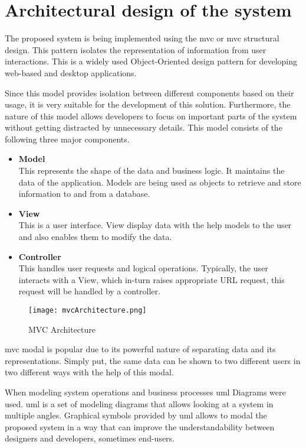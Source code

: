 \documentclass[12pt]{report}
\begin{document}
\section{Architectural design of the system}
The proposed system is being implemented using the \acrshort{mvc} or \acrlong{mvc} structural design. This pattern isolates the representation of information from user interactions. This is a widely used Object-Oriented design pattern for developing web-based and desktop applications.

Since this model provides isolation between different components based on their usage, it is very suitable for the development of this solution. Furthermore, the nature of this model allows developers to focus on important parts of the system without getting distracted by unnecessary details. This model consists of the following three major components.
\begin{itemize}
	\item {\bf{Model}}\\
	      This represents the shape of the data and business logic. It maintains the data of the application. Models are being used as objects to retrieve and store information to and from a database.

	\item {\bf{View}}\\
	      This is a user interface. View display data with the help models to the user and also enables them to modify the data.

	\item {\bf{Controller}}\\
	      This handles user requests and logical operations. Typically, the user interacts with a View, which in-turn raises appropriate URL request, this request will be handled by a controller.
\end{itemize}

\begin{figure}[H]
	\centering
	\texttt{[image: mvcArchitecture.png]}
	\caption{MVC Architecture}
	\label{fig:mvcArchitecture}
\end{figure}


\acrshort{mvc} modal is popular due to its powerful nature of separating data and its representations. Simply put, the same data can be shown to two different users in two different ways with the help of this modal.

When modeling system operations and business processes \acrshort{uml} Diagrams were used. \acrshort{uml} is a set of modeling diagrams that allows looking at a system in multiple angles. Graphical symbols provided by \acrshort{uml} allows to modal the proposed system in a way that can improve the understandability between designers and developers, sometimes end-users.
\end{document}

